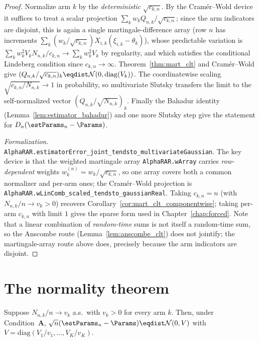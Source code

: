\begin{proof}\leanok
{}
Normalize arm $k$ by the \emph{deterministic} $\sqrt{c_{k,n}}$. By the Cramér--Wold device it
suffices to treat a scalar projection $\sum_k w_k Q_{n,k}/\sqrt{c_{k,n}}$; since the arm indicators
are disjoint, this is again a single martingale-difference array (row $n$ has increments
$\sum_k (w_k/\sqrt{c_{k,n}})X_{i,k}(\xi_{i,k}-\theta_k)$), whose predictable variation is
$\sum_k w_k^2 V_k N_{n,k}/c_{k,n}\to\sum_k w_k^2V_k$ by regularity, and which satisfies the
conditional Lindeberg condition since $c_{k,n}\to\infty$. Theorem~\ref{thm:mart_clt} and
Cramér--Wold give $(Q_{n,k}/\sqrt{c_{k,n}})_k\eqdist\mathcal N(0,\mathrm{diag}(V_k))$. The
coordinatewise scaling $\sqrt{c_{k,n}/N_{n,k}}\to1$ in probability, so multivariate Slutsky
transfers the limit to the self-normalized vector $(Q_{n,k}/\sqrt{N_{n,k}})_k$. Finally the Bahadur
identity (Lemma~\ref{lem:estimator_bahadur}) and one more Slutsky step give the statement for
$D_n(\estParams_n-\Params)$.

\emph{Formalization.} \texttt{AlphaRAR.estimatorError\_joint\_tendsto\_multivariateGaussian}. The key
device is that the weighted martingale array \texttt{AlphaRAR.wArray} carries \emph{row-dependent}
weights $w^{(n)}_k = w_k/\sqrt{c_{k,n}}$, so one array covers both a common normalizer and per-arm
ones; the Cramér--Wold projection is
\texttt{AlphaRAR.wLinComb\_scaled\_tendsto\_gaussianReal}. Taking $c_{k,n}=n$ (with
$N_{n,k}/n\to v_k>0$) recovers Corollary~\ref{cor:mart_clt_componentwise}; taking per-arm $c_{k,n}$
with limit $1$ gives the sparse form used in Chapter~\ref{chap:forced}. Note that a linear
combination of \emph{random-time} sums is not itself a random-time sum, so the Anscombe route
(Lemma~\ref{lem:anscombe_clt}) does not jointify; the martingale-array route above does, precisely
because the arm indicators are disjoint.
\end{proof}

\section{The normality theorem}
\label{sec:norm_main}

\begin{lemma}\label{lem:clt_theta}
\leanok
{}
Suppose $N_{n,k}/n\to v_k$ a.s.\ with $v_k>0$ for every arm $k$. Then, under
Condition~\textbf{A}, $\sqrt n(\estParams_n - \Params)\eqdist\mathcal{N}(0,V)$ with
$V=\mathrm{diag}(V_1/v_1,\dots,V_K/v_K)$.
\end{lemma}

